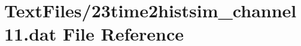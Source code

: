 \hypertarget{23time2histsim__channel11_8dat}{}\section{Text\+Files/23time2histsim\+\_\+channel11.dat File Reference}
\label{23time2histsim__channel11_8dat}
